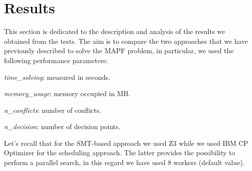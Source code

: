 \documentclass[12pt, a4paper, hidelinks]{article}
\numberwithin{equation}{section}
\begin{document}
\section{Results}\label{sec:results}
This section is dedicated to the description and analysis of the results we obtained from the tests.
The aim is to compare the two approaches that we have previously described to solve the MAPF problem,
in particular, we used the following performance parameters:

\begin{description}
    \item \textit{time\_solving}: measured in seconds.
    \item \textit{memory\_usage}: memory occupied in MB\@.
    \item \textit{n\_conflicts}: number of conflicts.
    \item \textit{n\_decision}: number of decision points.
\end{description}

Let's recall that for the SMT-based approach we used Z3 while we used IBM CP Optimizer for the scheduling approach.
The latter provides the possibility to perform a parallel search, in this regard we have used 8 workers (default value).
\end{document}
